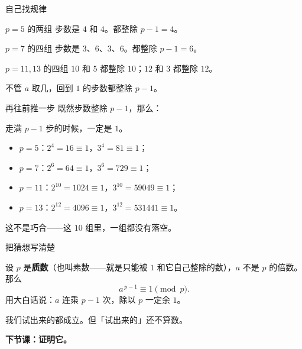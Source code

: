 \documentclass[10pt]{beamer}
\begin{document}
\begin{frame}{自己找规律}
  \begin{block}{\(p=5\) 的两组}
    步数是 \(4\) 和 \(4\)。\pause 都整除 \(p-1=4\)。
  \end{block}
  \begin{block}{\(p=7\) 的四组}
    步数是 \(3\)、\(6\)、\(3\)、\(6\)。\pause 都整除 \(p-1=6\)。
  \end{block}
  \begin{block}{\(p=11,13\) 的四组}
    \(10\) 和 \(5\) 都整除 \(10\)；\(12\) 和 \(3\) 都整除 \(12\)。
  \end{block}
  \pause
  \begin{center}
    {\large 不管 \(a\) 取几，回到 \(1\) 的步数都整除 \(p-1\)。}
  \end{center}
\end{frame}

\begin{frame}{再往前推一步}
  既然步数整除 \(p-1\)，那么：
  \pause
  \begin{center}
    {\large 走满 \(p-1\) 步的时候，一定是 \(1\)。}
  \end{center}
  \pause
  \begin{itemize}
    \item \(p=5\)：\(2^4=16\equiv1\)，\(3^4=81\equiv1\)；
    \item \(p=7\)：\(2^6=64\equiv1\)，\(3^6=729\equiv1\)；
    \item \(p=11\)：\(2^{10}=1024\equiv1\)，\(3^{10}=59049\equiv1\)；
    \item \(p=13\)：\(2^{12}=4096\equiv1\)，\(3^{12}=531441\equiv1\)。
  \end{itemize}
  \pause
  \begin{center}
    这不是巧合——这 \(10\) 组里，一组都没有落空。
  \end{center}
\end{frame}

\begin{frame}{把猜想写清楚}
  \begin{theorem}[猜想]
    设 \(p\) 是\textbf{质数}（也叫素数——就是只能被 \(1\) 和它自己整除的数），\(a\) 不是 \(p\) 的倍数。那么
    \[
      a^{\,p-1}\equiv1 \pmod p .
    \]
    用大白话说：\(a\) 连乘 \(p-1\) 次，除以 \(p\) 一定余 \(1\)。
  \end{theorem}
  \pause
  \begin{center}
    {\large 我们试出来的都成立。\pause 但「试出来的」还不算数。}
  \end{center}
  \pause
  \begin{center}
    {\Large\textcolor{textgreen}{\bfseries 下节课：证明它。}}
  \end{center}
\end{frame}
\end{document}

